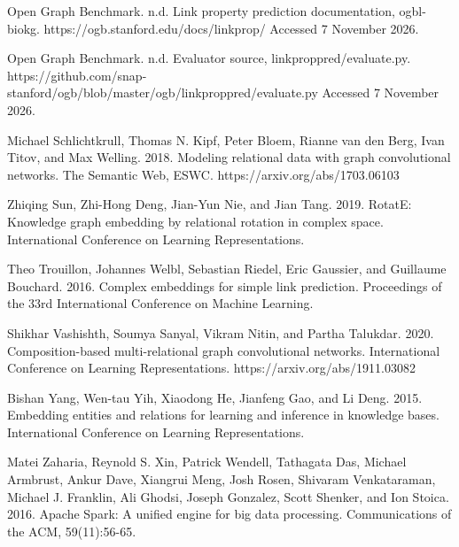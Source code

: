 \documentclass[11pt]{article}
\begin{document}
Open Graph Benchmark. n.d. Link property prediction documentation, ogbl-biokg. https://ogb.stanford.edu/docs/linkprop/ Accessed 7 November 2026.

Open Graph Benchmark. n.d. Evaluator source, linkproppred/evaluate.py. https://github.com/snap-stanford/ogb/blob/master/ogb/linkproppred/evaluate.py Accessed 7 November 2026.

Michael Schlichtkrull, Thomas N. Kipf, Peter Bloem, Rianne van den Berg, Ivan Titov, and Max Welling. 2018. Modeling relational data with graph convolutional networks. The Semantic Web, ESWC. https://arxiv.org/abs/1703.06103

Zhiqing Sun, Zhi-Hong Deng, Jian-Yun Nie, and Jian Tang. 2019. RotatE: Knowledge graph embedding by relational rotation in complex space. International Conference on Learning Representations.

Theo Trouillon, Johannes Welbl, Sebastian Riedel, Eric Gaussier, and Guillaume Bouchard. 2016. Complex embeddings for simple link prediction. Proceedings of the 33rd International Conference on Machine Learning.

Shikhar Vashishth, Soumya Sanyal, Vikram Nitin, and Partha Talukdar. 2020. Composition-based multi-relational graph convolutional networks. International Conference on Learning Representations. https://arxiv.org/abs/1911.03082

Bishan Yang, Wen-tau Yih, Xiaodong He, Jianfeng Gao, and Li Deng. 2015. Embedding entities and relations for learning and inference in knowledge bases. International Conference on Learning Representations.

Matei Zaharia, Reynold S. Xin, Patrick Wendell, Tathagata Das, Michael Armbrust, Ankur Dave, Xiangrui Meng, Josh Rosen, Shivaram Venkataraman, Michael J. Franklin, Ali Ghodsi, Joseph Gonzalez, Scott Shenker, and Ion Stoica. 2016. Apache Spark: A unified engine for big data processing. Communications of the ACM, 59(11):56-65.
\end{document}
